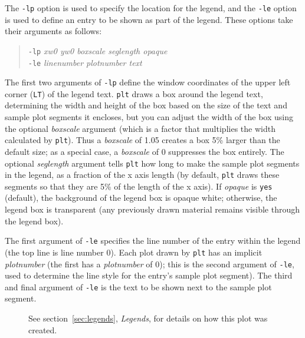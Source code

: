 \documentclass{book}
\begin{document}
%
%
The {\tt -lp} option is used to specify the location for the legend,
and the {\tt -le} option is used to define an entry to be shown as
part of the legend.  These options take their arguments as follows:

\begin{quote}
{\tt -lp} \emph{xw0 yw0 boxscale seglength opaque}\\
{\tt -le} \emph{linenumber plotnumber text}
\end{quote}

%
The first two arguments of {\tt -lp} define the window coordinates of
the upper left corner ({\tt LT}) of the legend text.  {\tt plt} draws
a box around the legend text, determining the width and height of the
box based on the size of the text and sample plot segments it
encloses, but you can adjust the width of the box using the optional
{\em boxscale} argument (which is a factor that multiplies the width
calculated by {\tt plt}).  Thus a {\em boxscale} of 1.05 creates a box
5\% larger than the default size; as a special case, a {\em boxscale}
of 0 suppresses the box entirely.  The optional {\em seglength}
argument tells {\tt plt} how long to make the sample plot segments in
the legend, as a fraction of the x axis length (by default, {\tt plt}
draws these segments so that they are 5\% of the length of the x
axis).  If {\em opaque} is {\tt yes} (default), the background of the
legend box is opaque white;  otherwise, the legend box is transparent
(any previously drawn material remains visible through the legend box).

%
The first argument of {\tt -le} specifies the line number of the entry
within the legend (the top line is line number 0).  Each plot drawn by
{\tt plt} has an implicit {\em plotnumber} (the first has a {\em
plotnumber} of 0); this is the second argument of {\tt -le}, used to
determine the line style for the entry's sample plot segment).  The
third and final argument of {\tt -le} is the text to be shown next to
the sample plot segment.

\begin{figure}
\begin{center}
\end{center}
\caption[Making legends with symbols]{See section~\ref{sec:legends}, {\em
Legends}, for details on how this plot was created.
\label{fig:example10}}
\end{figure}
\end{document}
